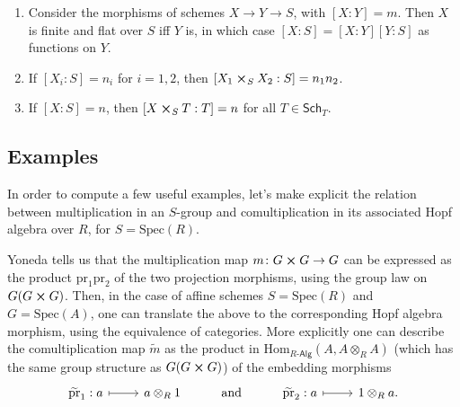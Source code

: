 \begin{prop}\leavevmode\vspace{-.2\baselineskip}
\begin{enumerate}
	\item Consider the morphisms of schemes $X \to Y \to S$, with $[X:Y] = m$.
		Then $X$ is finite and flat over $S$ iff $Y$ is, in which case
		$[X:S] = [X:Y] [Y:S]$ as functions on $Y$.
		
	\item If $[X_i:S] = n_i$ for $i=1,2$, then
		$[X_1 \cross_{ S } X_2 : S] = n_1n_2$.

	\item If $[X:S] = n$, then $[X \cross_{ S } T : T] = n$
		for all $T \in \mathsf{Sch}_{ T }$.
\end{enumerate}
\end{prop}


\subsection{Examples}
In order to compute a few useful examples, let's make explicit the relation between
multiplication in an $S$-group and comultiplication in its associated Hopf algebra over
$R$, for $S = \mathrm{Spec}(R)$.
\begin{rem}\label{rem:ExplicitComult}
	Yoneda tells us that the multiplication map 
	$m\colon G \cross G \to G$ can be expressed
	as the product $\mathrm{pr}_1 \mathrm{pr}_2$
	of the two projection morphisms, using the group law
	on $G(G \cross G)$.
	Then, in the case of affine schemes $S = \mathrm{Spec}(R)$
	and $G = \mathrm{Spec}(A)$, one can translate the above to the corresponding
	Hopf algebra morphism, using the equivalence of categories.
	More explicitly one can describe the comultiplication map
	$\widetilde{m}$ as the product in 
	$\mathrm{Hom}_{R\text{-}\mathsf{Alg}} \left( A, A \otimes_R A \right)$ 
	(which has the same group structure as $G(G \cross G)$)
	of the embedding morphisms
	\begin{equation*}
	\begin{tikzcd}
		\widetilde{\mathrm{pr}}_1: a \arrow[r, "", mapsto] &
		a \otimes_R 1 &
		\text{and} &
		\widetilde{\mathrm{pr}}_2: a \arrow[r, "", mapsto] &
		1 \otimes_R a
	.\end{tikzcd}
	\end{equation*}
\end{rem}


